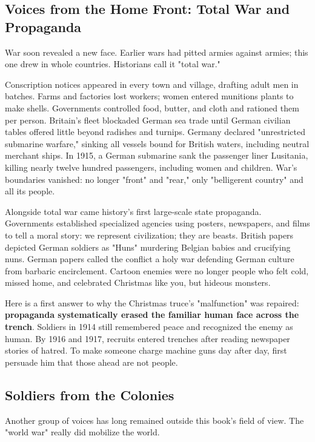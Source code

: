 \subsection{Voices from the Home Front: Total War and Propaganda}
War soon revealed a new face. Earlier wars had pitted armies against armies; this one drew in whole countries. Historians call it "total war."

Conscription notices appeared in every town and village, drafting adult men in batches. Farms and factories lost workers; women entered munitions plants to make shells. Governments controlled food, butter, and cloth and rationed them per person. Britain's fleet blockaded German sea trade until German civilian tables offered little beyond radishes and turnips. Germany declared "unrestricted submarine warfare," sinking all vessels bound for British waters, including neutral merchant ships. In 1915, a German submarine sank the passenger liner Lusitania, killing nearly twelve hundred passengers, including women and children. War's boundaries vanished: no longer "front" and "rear," only "belligerent country" and all its people.

Alongside total war came history's first large-scale state propaganda. Governments established specialized agencies using posters, newspapers, and films to tell a moral story: we represent civilization; they are beasts. British papers depicted German soldiers as "Huns" murdering Belgian babies and crucifying nuns. German papers called the conflict a holy war defending German culture from barbaric encirclement. Cartoon enemies were no longer people who felt cold, missed home, and celebrated Christmas like you, but hideous monsters.

Here is a first answer to why the Christmas truce's "malfunction" was repaired: \textbf{propaganda systematically erased the familiar human face across the trench}. Soldiers in 1914 still remembered peace and recognized the enemy as human. By 1916 and 1917, recruits entered trenches after reading newspaper stories of hatred. To make someone charge machine guns day after day, first persuade him that those ahead are not people.

\subsection{Soldiers from the Colonies}
Another group of voices has long remained outside this book's field of view. The "world war" really did mobilize the world.

